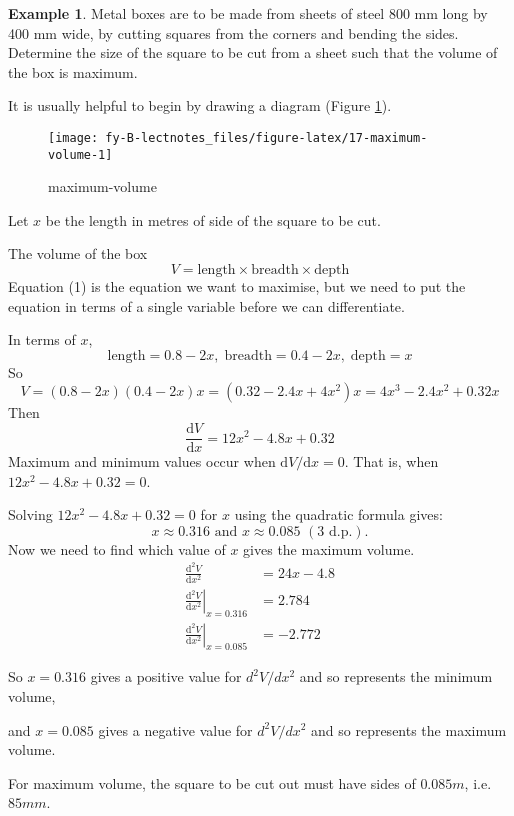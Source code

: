 \documentclass[
  11pt,
  oneside]{book}
\newcommand{\slide}{}
\theoremstyle{definition}
\theoremstyle{definition}
\newtheorem{example}{Example}[chapter]
\theoremstyle{definition}
\theoremstyle{definition}
\theoremstyle{remark}
\begin{document}
\slide

\begin{example}
Metal boxes are to be made from sheets of steel 800 mm long by 400 mm wide, by cutting squares from the corners and bending the sides. Determine the size of the square to be cut from a sheet such that the volume of the box is maximum.
\end{example}

It is usually helpful to begin by drawing a diagram (Figure \ref{fig:17-maximum-volume}).

\begin{figure}

{\centering \texttt{[image: fy-B-lectnotes\_files/figure-latex/17-maximum-volume-1]} 

}

\caption{maximum-volume}\label{fig:17-maximum-volume}
\end{figure}

Let \(x\) be the length in metres of side of the square to be cut.

The volume of the box
\[
V = \text{length}\times\text{breadth}\times\text{depth}\tag{1}
\]
Equation (1) is the equation we want to maximise, but we need to put the equation in terms of a single variable before we can differentiate.

\begin{notslides}

In terms of \(x\),
\[
\text{length} = 0.8 - 2x,\; \text{breadth} = 0.4 - 2x,\;\text{depth} = x
\]
So
\[
V = (0.8 - 2x)(0.4 - 2x)x = (0.32 - 2.4x + 4x^2)x = 4x^3 - 2.4x^2 + 0.32x
\]
Then
\[
\frac{\mathrm{d}V}{\mathrm{d} x} = 12x^2 - 4.8x + 0.32
\]
Maximum and minimum values occur when \(\mathrm{d}V/\mathrm{d}x  = 0\).
That is, when \(12x^2 - 4.8x + 0.32= 0\).

Solving \(12x^2 - 4.8x + 0.32= 0\) for \(x\) using the quadratic formula gives:
\[
 x \approx 0.316\text{ and }x \approx 0.085\,\,(3\text{ d.p.}).
\]
Now we need to find which value of \(x\) gives the maximum volume.
\begin{align*}
\frac{\mathrm{d}^2 V}{\mathrm{d} x^2} &= 24x - 4.8\\
\left.\frac{\mathrm{d}^2 V}{\mathrm{d} x^2}\right\vert_{x=0.316} &= 2.784\\
\left.\frac{\mathrm{d}^2 V}{\mathrm{d} x^2}\right\vert_{x=0.085} &= -2.772
\end{align*}

So \(x=0.316\) gives a positive value for \(d^2V/dx^2\) and so represents the minimum volume,

and \(x=0.085\) gives a negative value for \(d^2V/dx^2\) and so represents the maximum volume.

For maximum volume, the square to be cut out must have sides of \(0.085 m\), i.e.~\(85 mm\).

\end{notslides}
\end{document}
